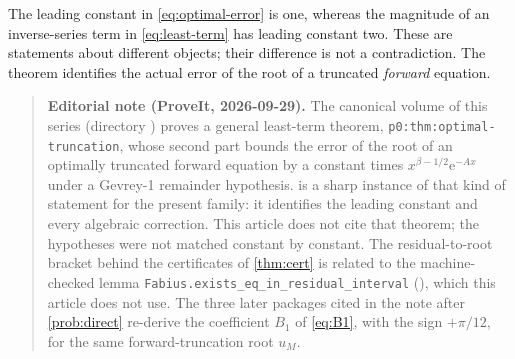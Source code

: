 \documentclass[11pt,a4paper]{article}
\theoremstyle{definition}
\numberwithin{equation}{section}
\newcommand{\ee}{\mathrm{e}}
\begin{document}
The leading constant in \eqref{eq:optimal-error} is one, whereas the magnitude of an inverse-series term in \eqref{eq:least-term} has leading constant two. These are statements about different objects; their difference is not a contradiction. The theorem identifies the actual error of the root of a truncated \emph{forward} equation.

\begin{quote}\small\textbf{Editorial note (ProveIt, 2026-09-29).} The canonical volume  of this series (directory ) proves a general least-term theorem, \texttt{p0:thm:optimal-truncation}, whose second part bounds the error of the root of an optimally truncated forward equation by a constant times $x^{\beta-1/2}\ee^{-Ax}$ under a Gevrey-1 remainder hypothesis.  is a sharp instance of that kind of statement for the present family: it identifies the leading constant and every algebraic correction. This article does not cite that theorem; the hypotheses were not matched constant by constant. The residual-to-root bracket behind the certificates of \cref{thm:cert} is related to the machine-checked lemma \texttt{Fabius.exists\_eq\_in\_residual\_interval} (), which this article does not use. The three later packages cited in the note after \cref{prob:direct} re-derive the coefficient $B_1$ of \eqref{eq:B1}, with the sign $+\pi/12$, for the same forward-truncation root $u_M$.\end{quote}
\end{document}
